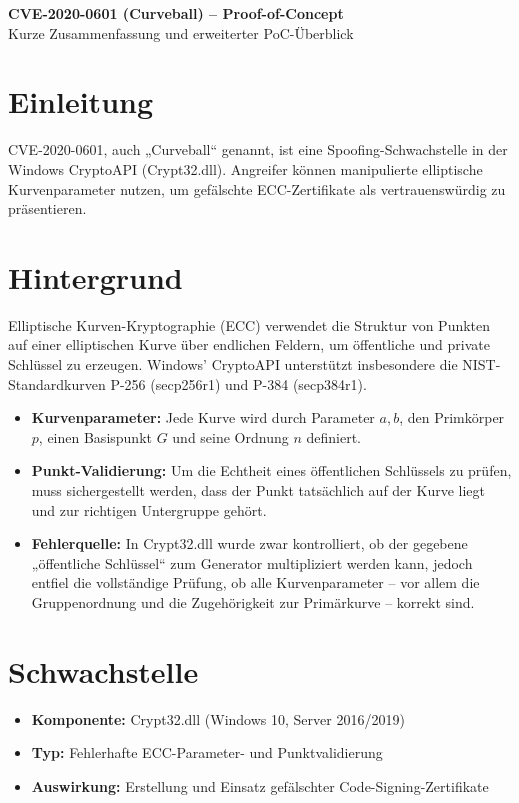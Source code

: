 \documentclass[paper=a4,fontsize=11pt]{scrartcl}
\begin{document}
\begin{center}
  {\LARGE\bfseries CVE-2020-0601 (Curveball) – Proof-of-Concept}\\[1ex]
  {\small Kurze Zusammenfassung und erweiterter PoC-Überblick}
\end{center}

\section*{Einleitung}
CVE-2020-0601, auch „Curveball“ genannt, ist eine Spoofing-Schwachstelle in der Windows CryptoAPI (Crypt32.dll). Angreifer können manipulierte elliptische Kurvenparameter nutzen, um gefälschte ECC-Zertifikate als vertrauenswürdig zu präsentieren.

\section*{Hintergrund}
Elliptische Kurven-Kryptographie (ECC) verwendet die Struktur von Punkten auf einer elliptischen Kurve über endlichen Feldern, um öffentliche und private Schlüssel zu erzeugen. Windows’ CryptoAPI unterstützt insbesondere die NIST-Standardkurven P-256 (secp256r1) und P-384 (secp384r1).  
\begin{itemize}
  \item \textbf{Kurvenparameter:} Jede Kurve wird durch Parameter \(a, b\), den Primkörper \(p\), einen Basispunkt \(G\) und seine Ordnung \(n\) definiert.  
  \item \textbf{Punkt-Validierung:} Um die Echtheit eines öffentlichen Schlüssels zu prüfen, muss sichergestellt werden, dass der Punkt tatsächlich auf der Kurve liegt und zur richtigen Untergruppe gehört.  
  \item \textbf{Fehlerquelle:} In Crypt32.dll wurde zwar kontrolliert, ob der gegebene „öffentliche Schlüssel“ zum Generator multipliziert werden kann, jedoch entfiel die vollständige Prüfung, ob alle Kurvenparameter – vor allem die Gruppenordnung und die Zugehörigkeit zur Primärkurve – korrekt sind. 
\end{itemize}
\section*{Schwachstelle}
\begin{itemize}
  \item \textbf{Komponente:} Crypt32.dll (Windows 10, Server 2016/2019)
  \item \textbf{Typ:} Fehlerhafte ECC-Parameter- und Punktvalidierung
  \item \textbf{Auswirkung:} Erstellung und Einsatz gefälschter Code-Signing-Zertifikate
\end{itemize}
\end{document}
